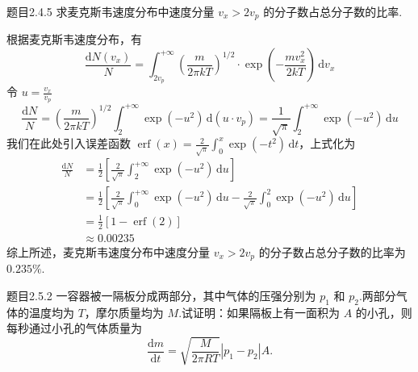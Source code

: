 \begin{question}{题目2.4.5}
    求麦克斯韦速度分布中速度分量 $v_x > 2v_p$ 的分子数占总分子数的比率.
\end{question}
\begin{solution}
    根据麦克斯韦速度分布，有
    $$
        \frac{\mathrm{d}N(v_x)}{N}
        = \int_{2v_p}^{+\infty} \left(\frac{m}{2 \pi kT}\right)^{1/2} \cdot \exp\left(-\frac{mv_x^2}{2kT}\right) \,\mathrm{d}v_x
    $$
    令 $u = \frac{v_x}{v_p}$
    $$
        \frac{\mathrm{d}N}{N}
        = \left(\frac{m}{2 \pi kT}\right)^{1/2} \int_{2}^{+\infty} \exp(-u^2) \,\mathrm{d}(u \cdot v_p)
        = \frac{1}{\sqrt{\pi}}\int_{2}^{+\infty} \exp(-u^2) \,\mathrm{d}u
    $$
    我们在此处引入误差函数 $\displaystyle \operatorname{erf}(x) = \frac{2}{\sqrt{\pi}}\int_0^x \exp(-t^2) \,\mathrm{d}t$，上式化为
    $$
        \begin{aligned}
            \frac{\mathrm{d}N}{N}
             & = \frac{1}{2} \left[ \frac{2}{\sqrt{\pi}}\int_{2}^{+\infty} \exp(-u^2) \,\mathrm{d}u \right] \\
             & = \frac{1}{2} \left[\frac{2}{\sqrt{\pi}}\int_0^{+\infty}\exp(-u^2) \,\mathrm{d}u
            - \frac{2}{\sqrt{\pi}}\int_0^2\exp(-u^2) \,\mathrm{d}u \right]                                  \\
             & = \frac{1}{2} \left[ 1 - \operatorname{erf}(2)\right]                                        \\
             & \approx 0.00235
        \end{aligned}
    $$
    综上所述，麦克斯韦速度分布中速度分量 $v_x > 2v_p$ 的分子数占总分子数的比率为 $0.235\%$.
\end{solution}

\begin{question}{题目2.5.2}
    一容器被一隔板分成两部分，其中气体的压强分别为 $p_1$ 和 $p_2$.两部分气体的温度均为 $T$，摩尔质量均为 $M$.试证明：如果隔板上有一面积为 $A$ 的小孔，则每秒通过小孔的气体质量为
    $$
        \frac{\mathrm{d}m}{\mathrm{d}t} = \sqrt{\frac{M}{2\pi RT}} |p_1 - p_2| A.
    $$
\end{question}

